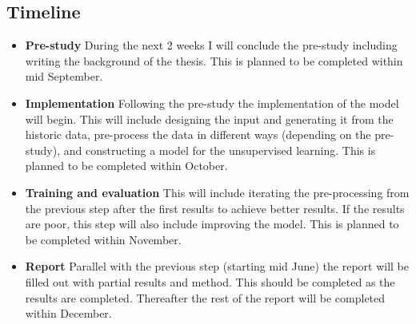 \documentclass{article}
\begin{document}
\subsection{Timeline}
\begin{itemize}
\item{\bf Pre-study} During the next 2 weeks I will conclude the pre-study including writing the background of the thesis. This is planned to be completed within mid September.
\item{\bf Implementation} Following the pre-study the implementation of the model will begin. This will include designing the input and generating it from the historic data, pre-process the data in different ways (depending on the pre-study), and constructing a model for the unsupervised learning. This is planned to be completed within October.
\item{\bf Training and evaluation} This will include iterating the pre-processing from the previous step after the first results to achieve better results. If the results are poor, this step will also include improving the model. This is planned to be completed within November.
\item{\bf Report} Parallel with the previous step (starting mid June) the report will be filled out with partial results and method. This should be completed as the results are completed. Thereafter the rest of the report will be completed within December.
\end{itemize}

{}

\end{document}
